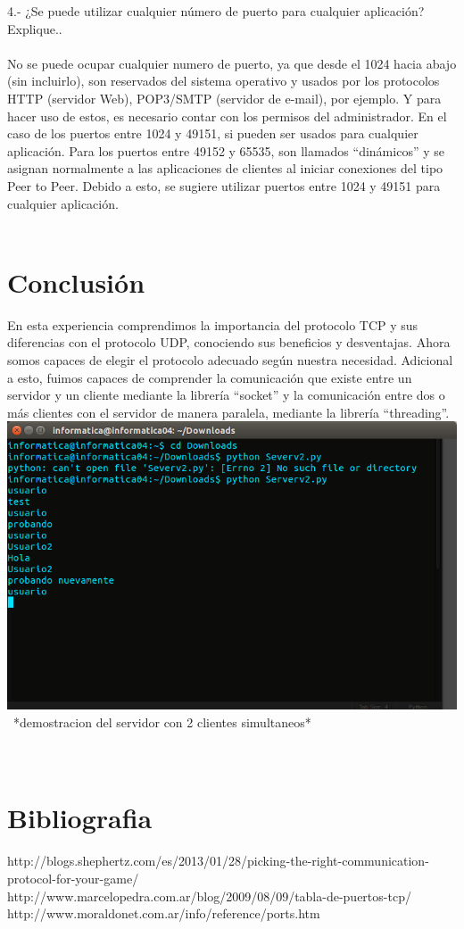 \documentclass{article}
\begin{document}
4.- ¿Se puede utilizar cualquier número de puerto para cualquier aplicación? Explique..\\\\

No se puede ocupar cualquier numero de puerto, ya que desde el 1024 hacia abajo (sin incluirlo), son reservados del sistema operativo y usados por los protocolos HTTP (servidor Web), POP3/SMTP (servidor de e-mail), por ejemplo. Y para hacer uso de estos, es necesario contar con los permisos del administrador. En el caso de los puertos entre 1024 y 49151, si pueden ser usados para cualquier aplicación. 
Para los puertos entre 49152 y 65535, son llamados “dinámicos” y se asignan normalmente a las aplicaciones de clientes al iniciar conexiones del tipo Peer to Peer. 
Debido a esto, se sugiere utilizar puertos entre 1024 y 49151 para cualquier aplicación.\\\\

\section{Conclusión}

En esta experiencia comprendimos la importancia del protocolo TCP y sus diferencias con el protocolo UDP, conociendo sus beneficios y desventajas. Ahora somos capaces de elegir el protocolo adecuado según nuestra necesidad. 
Adicional a esto, fuimos capaces de comprender la comunicación que existe entre un servidor y un cliente mediante la librería “socket” y la comunicación entre dos o más clientes con el servidor de manera paralela, mediante la librería “threading”.\\

\includegraphics[width=1\textwidth]{server.png}\
*demostracion del servidor con 2 clientes simultaneos*\\\\\

\section{Bibliografia}
http://blogs.shephertz.com/es/2013/01/28/picking-the-right-communication-protocol-for-your-game/\\
http://www.marcelopedra.com.ar/blog/2009/08/09/tabla-de-puertos-tcp/\\
http://www.moraldonet.com.ar/info/reference/ports.htm\\
\end{document}
